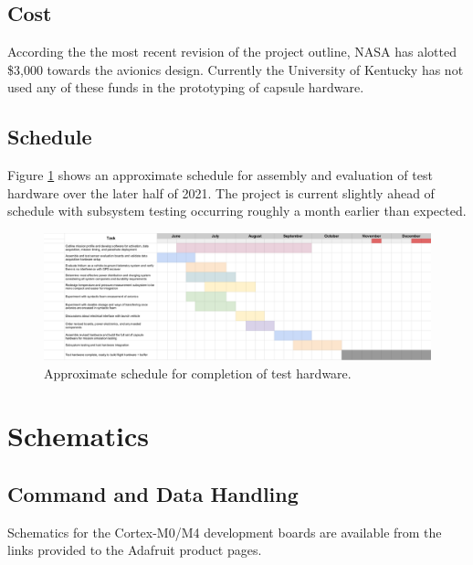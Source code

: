 \documentclass{article}
\begin{document}
\subsection{Cost}
According the the most recent revision of the project outline, NASA has alotted \$3,000 towards the avionics design. Currently the University of Kentucky has not used any of these funds in the prototyping of capsule hardware.


\subsection{Schedule}
Figure \ref{fig:schedule} shows an approximate schedule for assembly and evaluation of test hardware over the later half of 2021. The project is current slightly ahead of schedule with subsystem testing occurring roughly a month earlier than expected.
\begin{figure}[H]
	\centering
	\includegraphics[width=\textwidth]{images/schedule.png}
	\caption{Approximate schedule for completion of test hardware.}
	\label{fig:schedule}
\end{figure}





\appendix


\section{Schematics}
\label{appa}

\subsection{Command and Data Handling}
Schematics for the Cortex-M0/M4 development boards are available from the links provided to the Adafruit product pages.
\end{document}
